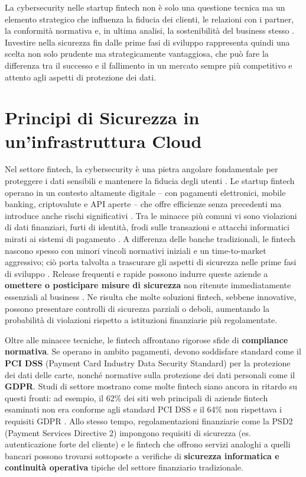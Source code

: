 \documentclass[a4paper,12pt]{report}
\begin{document}
La cybersecurity nelle startup fintech non è solo una questione tecnica ma un elemento strategico che influenza la fiducia dei clienti, le relazioni con i partner, la conformità normativa e, in ultima analisi, la sostenibilità del business stesso \cite{cyberThreatsFintech}. Investire nella sicurezza fin dalle prime fasi di sviluppo rappresenta quindi una scelta non solo prudente ma strategicamente vantaggiosa, che può fare la differenza tra il successo e il fallimento in un mercato sempre più competitivo e attento agli aspetti di protezione dei dati.
%
% 

\chapter{Principi di Sicurezza in un'infrastruttura Cloud} 
\label{chapter:introduzione}

Nel settore fintech, la cybersecurity è una pietra angolare fondamentale per proteggere i dati sensibili e mantenere la fiducia degli utenti \cite{netguru2023}. Le startup fintech operano in un contesto altamente digitale – con pagamenti elettronici, mobile banking, criptovalute e API aperte – che offre efficienze senza precedenti ma introduce anche rischi significativi \cite{netguru2023}. Tra le minacce più comuni vi sono violazioni di dati finanziari, furti di identità, frodi sulle transazioni e attacchi informatici mirati ai sistemi di pagamento \cite{netguru2023}. A differenza delle banche tradizionali, le fintech nascono spesso con minori vincoli normativi iniziali e un time-to-market aggressivo; ciò porta talvolta a trascurare gli aspetti di sicurezza nelle prime fasi di sviluppo \cite{netguru2023}. Release frequenti e rapide possono indurre queste aziende a \textbf{omettere o posticipare misure di sicurezza} non ritenute immediatamente essenziali al business \cite{netguru2023}. Ne risulta che molte soluzioni fintech, sebbene innovative, possono presentare controlli di sicurezza parziali o deboli, aumentando la probabilità di violazioni rispetto a istituzioni finanziarie più regolamentate.

Oltre alle minacce tecniche, le fintech affrontano rigorose sfide di \textbf{compliance normativa}. Se operano in ambito pagamenti, devono soddisfare standard come il \textbf{PCI DSS} (Payment Card Industry Data Security Standard) per la protezione dei dati delle carte, nonché normative sulla protezione dei dati personali come il \textbf{GDPR}. Studi di settore mostrano come molte fintech siano ancora in ritardo su questi fronti: ad esempio, il 62\% dei siti web principali di aziende fintech esaminati non era conforme agli standard PCI DSS e il 64\% non rispettava i requisiti GDPR \cite{sproWhitepaper}. Allo stesso tempo, regolamentazioni finanziarie come la PSD2 (Payment Services Directive 2) impongono requisiti di sicurezza (es. autenticazione forte del cliente) e le fintech che offrono servizi analoghi a quelli bancari possono trovarsi sottoposte a verifiche di \textbf{sicurezza informatica e continuità operativa} tipiche del settore finanziario tradizionale.
\end{document}
